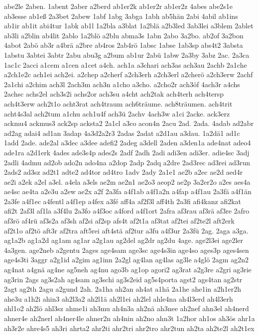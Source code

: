 {abe2le
2aben.
1abent
2aber
a2berd
ab1er2k
ab1er2r
ab1er2z
4abes
abe2s1e
ab3esse
ab1eß
2a3bet
2abew
1abf
1abg
3abga
1abh
ab5hän
2abi
4abil
ab1ins
ab1ir
ab1it
abi4tur
1abk
ab1l
1a2bla
a3blat
1a2blä
a2b3led
3ab3lei
a3blem
2ablet
ab3li
a2blin
ab4lit
2ablo
1a2blö
a2blu
abma3s
1abn
2abo
3a2bo.
ab2of
3a2bon
4abot
2abö
ab3r
a4brä
a2bre
ab4ros
2ab4rö
1absc
1abse
1ab3sp
abs4t2
3absta
1abstu
3abtei
3abtr
2abu
abu3g
a2bum
ab1ur
2abü
1abw
2a3by
3abz
2ac.
2a3ca
1ac1c
2acci
a1cem
a1cen
a1cet
a4ch.
ach1a
a3chari
ach3as
ach3au
2achb
2a1che
a2ch1e2c
ach1ei
ach2ei.
a2chep
a2cherf
a2ch3erh
a2ch3erl
a2cherö
a2ch3erw
2achf
2a1chi
a2chim
ach3l
2ach3m
ach3n
a1cho
a3cho.
a2cho2r
ach3öf
4ach3r
a4chs
2achsc
achs2el
ach3s2i
achs2or
ach3su
a4cht
ach2tak
ach4terh
ach4tersp
ach4t3erw
ach2t1o
acht3rat
ach4traum
ach6träume.
ach8träumen.
ach4trit
acht4s3al
ach2tum
a1chu
ach1u4f
ach3ü
2achv
4ach3w
a1ci
2acke.
ack3erz
ackmu4
ackmus3
ack2sp
acksta2
2a1cl
a3co
acon4n
2acu
2ad.
2ada.
4adab
ad2abr
ad2ag
adai4
ad1an
3adap
4a3d2a2r3
2adas
2adat
a2d1au
a3dau.
1a2dä1
ad1c
1add
2ade.
ade2al
a3dec
a3dee
adefi2
2adeg
a3dell
2aden
a3den1a
ade4nat
adeo4
ade1ra
a2d1erk
4ades
ade3s4p
ades2s
2adf
2adh
2adi
adi3en
adi3er.
adie4sc
3adj
2adli
4admu
ad2ob
ado2n
ado4na
a2dop
2adp
2adq
a2dre
2ad3rec
ad3rei
ad3run
2ads2
ad3sz
ad2t1
adte2
ad4tor
ad4tro
1adv
2ady
2a1e1
ae2b
a2ec
ae2d
aed4r
ae2i
a2ek
a2el
a3el.
a4ela
a3els
ae2m
ae2n1
ae2o3
aeop2
ae2p
3a2er2o
a2es
aes4a
ae4sc
ae4ta
a2e3u
a2ew
ae2x
a2f
2a3fa
a4f1ab
a4f1a2n
a4fap
a4f1au
2a3fä
a4f1än
2a3fe
a4f1ec
a4fentl
a4f1ep
a4fex
a3fé
aff4a
af2f3l
aff4th
2a3fi
afi4kanz
afi2kat
afi2t
2af3l
af1la
a3f4lu
2a3fo
a4f3oc
a4ford
a4f1ort
2afra
af3rau
af3rä
af3re
2afro
af3rö
af4rü
af3s2a
af3sh
af2si
af2sp
afs4t
af2t1a
af3tat
af2tei
af2te2l
aft2erk
af2t1o
af2tö
aft3r
af2tra
aft5rei
aft4stä
af2tur
a3fu
a4f3ur
2a3fü
2ag.
2aga
a3ga.
ag1a2b
ag1a2d
ag1am
ag1ar
a2g1au
ag2del
ag2dr
ag2du
4age.
age2l3ei
age2ler
4a3gen.
age2neb
a2gentu
2ages
age4sam
age3sc
age4s3in
age4so
ages3p
ages4sen
age4s3ti
3aggr
a2g1id
a2gim
ag1inn
2a2gl
ag4lan
ag4las
ag3le
a4glö
2agm
ag2n2
ag4nat
a4gnä
ag4ne
ag5neh
ag4nu
ago3b
ag1op
agori2
ag3rat
a2g3re
a2gri
ag3rie
ag3rin
2ags
ag3s2ah
ag4sam
ag3schi
ag3s2eid
ag5s4porta
agst2
ags4tan
ag2str
2agt
ag2th
2agu
a2gund
2ah.
2a1ha
ah2an
ah4at
a1hä
2a1he
ahe1in
a2h1er2h
ahe3u
a1h2i
ahin3
ah2l3a2
ah2l1ä
ah2l1ei
ah2lel
ahle4na
ah4l3erd
ah4l3erh
ahl1o2
ah2lö
ahl3sz
ahme1i
ah3mu
ah4n3a
ah2nä
ah3nee
ah2nef
ahn3el
ah4nerd
ahner4e
ah2nerl
ah4ner4le
ahner2n
ah4nin
ah2no
ahn3t
1a2hor
ah1os
ah3ös
ahr1a
ah3r2e
ahre4s5
ah3ri
ahrta2
ahr2ti
ahr2tri
ahr2tro
ahr2tun
ah2ta
ah2te2l
ah2t1ex
}

